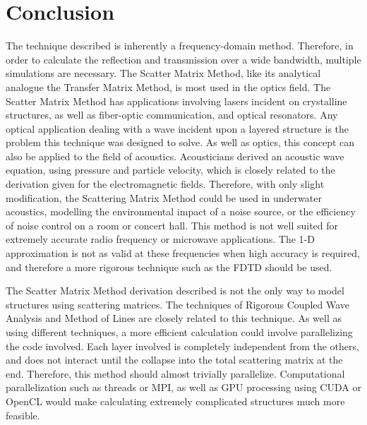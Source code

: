 \section{Conclusion} \label{sec:conclusion}
The technique described is inherently a frequency-domain method.  Therefore, in 
order to calculate the reflection and transmission over a wide bandwidth, 
multiple simulations are necessary.  The Scatter Matrix Method, like its 
analytical analogue the Transfer Matrix Method, is most used in the optics field.  
The Scatter Matrix Method has applications involving lasers incident on 
crystalline structures, as well as fiber-optic communication, and optical 
resonators.  Any optical application dealing with a wave incident upon a layered 
structure is the problem this technique was designed to solve.  As well as optics, 
this concept can also be applied to the field of acoustics.  Acousticians derived 
an acoustic wave equation, using pressure and particle velocity, which is closely 
related to the derivation given for the electromagnetic fields.  Therefore, with 
only slight modification, the Scattering Matrix Method could be used in 
underwater acoustics, modelling the environmental impact of a noise source, or 
the efficiency of noise control on a room or concert hall.  This method is not 
well suited for extremely accurate radio frequency or microwave applications.  
The 1-D approximation is not as valid at these frequencies when high accuracy is 
required, and therefore a more rigorous technique such as the FDTD should be used.  

The Scatter Matrix Method derivation described is not the only way to model 
structures using scattering matrices.  The techniques of Rigorous Coupled Wave 
Analysis and Method of Lines are closely related to this technique.  
As well as using different techniques, a more 
efficient calculation could involve parallelizing the code involved.  Each layer 
involved is completely independent from the others, and does not interact until 
the collapse into the total scattering matrix at the end.  Therefore, this method 
should almost trivially parallelize.  Computational parallelization such as 
threads or MPI, as well as GPU processing using CUDA or OpenCL would make 
calculating extremely complicated structures much more feasible. 


